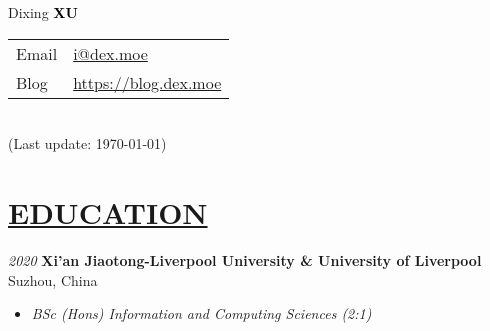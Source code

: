 \documentclass[11pt]{article}
\begin{document}
\begin{minipage}[t]{0.65\textwidth}
    {\Huge Dixing {\textbf{\textcolor{black}{XU}}}}
\end{minipage}
\begin{minipage}[t]{0.45\textwidth}
    {\small\raggedright
    \begin{tabular}{l@{: }l}
    Email & \href{mailto:i@dex.moe}{i@dex.moe} \\
    Blog & \href{https://blog.dex.moe}{https://blog.dex.moe} \\
    \end{tabular}\\
    (Last update: \today)
    }
\end{minipage}



%
\section*{\centering\underline{EDUCATION}}
\noindent\textit{2020} \large\textbf{Xi'an Jiaotong-Liverpool University \& University of Liverpool} \hfill Suzhou, China
\begin{itemize}[noitemsep, nolistsep]
    \item[] \textit{BSc (Hons) Information and Computing Sciences (2:1)}
\end{itemize} 
\vspace{20mm} %
\end{document}
